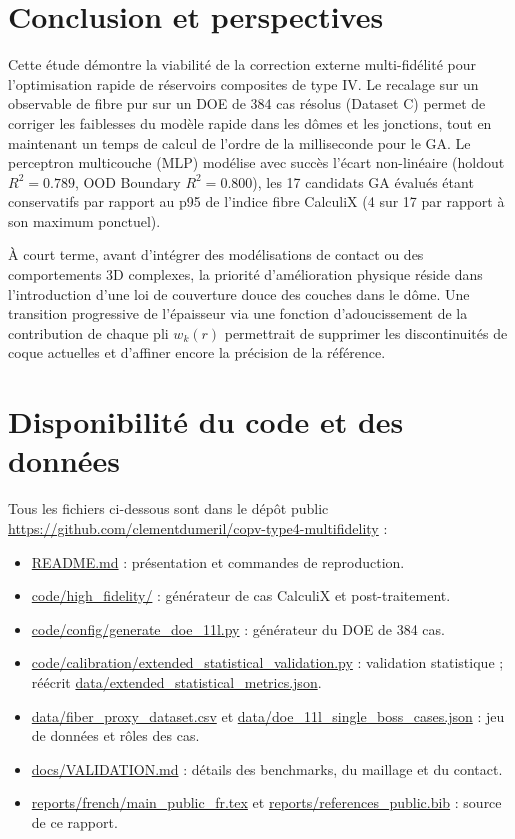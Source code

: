 \documentclass[10pt,twocolumn]{article}
\begin{document}
\section{Conclusion et perspectives}

Cette étude démontre la viabilité de la correction externe multi-fidélité pour l'optimisation rapide de réservoirs composites de type IV. Le recalage sur un observable de fibre pur sur un DOE de 384 cas résolus (Dataset C) permet de corriger les faiblesses du modèle rapide dans les dômes et les jonctions, tout en maintenant un temps de calcul de l'ordre de la milliseconde pour le GA. Le perceptron multicouche (MLP) modélise avec succès l'écart non-linéaire (holdout $R^2 = \num{0.789}$, OOD Boundary $R^2 = \num{0.800}$), les 17 candidats GA évalués étant conservatifs par rapport au p95 de l'indice fibre CalculiX (4 sur 17 par rapport à son maximum ponctuel).

À court terme, avant d'intégrer des modélisations de contact ou des comportements 3D complexes, la priorité d'amélioration physique réside dans l'introduction d'une loi de couverture douce des couches dans le dôme. Une transition progressive de l'épaisseur via une fonction d'adoucissement de la contribution de chaque pli $w_k(r)$ permettrait de supprimer les discontinuités de coque actuelles et d'affiner encore la précision de la référence.

\section{Disponibilité du code et des données}

Tous les fichiers ci-dessous sont dans le dépôt public \url{https://github.com/clementdumeril/copv-type4-multifidelity} :
\begin{itemize}
    \item \url{README.md} : présentation et commandes de reproduction.
    \item \url{code/high_fidelity/} : générateur de cas CalculiX et post-traitement.
    \item \url{code/config/generate_doe_11l.py} : générateur du DOE de 384 cas.
    \item \url{code/calibration/extended_statistical_validation.py} : validation statistique ; réécrit \url{data/extended_statistical_metrics.json}.
    \item \url{data/fiber_proxy_dataset.csv} et \url{data/doe_11l_single_boss_cases.json} : jeu de données et rôles des cas.
    \item \url{docs/VALIDATION.md} : détails des benchmarks, du maillage et du contact.
    \item \url{reports/french/main_public_fr.tex} et \url{reports/references_public.bib} : source de ce rapport.
\end{itemize}
\end{document}
